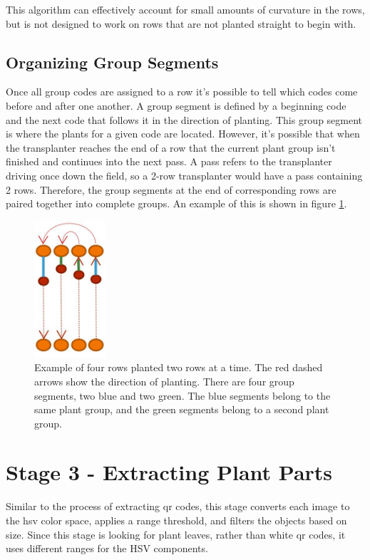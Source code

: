 This algorithm can effectively account for small amounts of curvature in the rows, but is not designed to work on rows that are not planted straight to begin with.

\subsection{Organizing Group Segments}

Once all group codes are assigned to a row it's possible to tell which codes come before and after one another.  A group segment is defined by a beginning code and the next code that follows it in the direction of planting.  This group segment is where the plants for a given code are located.  However, it's possible that when the transplanter reaches the end of a row that the current plant group isn't finished and continues into the next pass.  A pass refers to the transplanter driving once down the field, so a 2-row transplanter would have a pass containing 2 rows.  Therefore, the group segments at the end of corresponding rows are paired together into complete groups.  An example of this is shown in figure \ref{figure:group_segments}.

\begin{figure}
	\centering
    \includegraphics[height=2in]{figures/group_segments.jpg}
    \caption[Group segments]{Example of four rows planted two rows at a time.  The red dashed arrows show the direction of planting.  There are four group segments, two blue and two green.  The blue segments belong to the same plant group, and the green segments belong to a second plant group.}
    \label{figure:group_segments}
\end{figure}

\section{Stage 3 - Extracting Plant Parts}
\label{processing-stage3}

Similar to the process of extracting \ac{qr} codes, this stage converts each image to the \ac{hsv} color space, applies a range threshold, and filters the objects based on size.  Since this stage is looking for plant leaves, rather than white \ac{qr} codes, it uses different ranges for the HSV components.  

